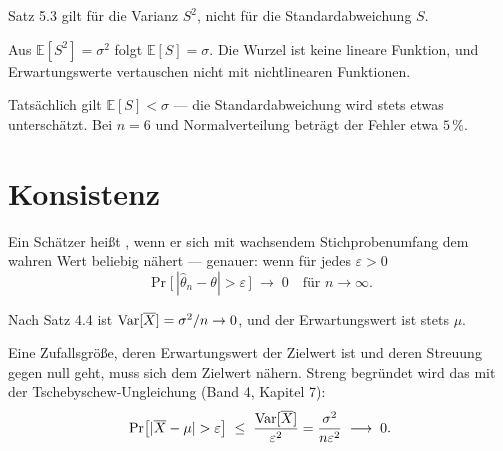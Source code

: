 \begin{warnung}
Satz 5.3 gilt für die Varianz $S^2$, nicht für die Standardabweichung $S$.

Aus $\mathbb{E}[S^2] = \sigma^2$ folgt  $\mathbb{E}[S] = \sigma$. Die Wurzel ist keine lineare Funktion, und Erwartungswerte vertauschen nicht mit nichtlinearen Funktionen.

Tatsächlich gilt $\mathbb{E}[S] < \sigma$ --- die Standardabweichung wird stets etwas unterschätzt. Bei $n=6$ und Normalverteilung beträgt der Fehler etwa $5\,\%$.

\begin{center}
\begin{minipage}{0.88\textwidth}
\end{minipage}
\end{center}
\end{warnung}

\section{Konsistenz}

\begin{definition}
Ein Schätzer heißt , wenn er sich mit wachsendem Stichprobenumfang dem wahren Wert beliebig nähert --- genauer: wenn für jedes $\varepsilon > 0$
\[ \Pr\bigl[\,|\hat\theta_n - \theta| > \varepsilon\,\bigr] \;\longrightarrow\; 0 \quad \text{für } n \to \infty . \]
\end{definition}

\begin{merksatz}
Nach Satz 4.4 ist $\operatorname{Var}[\overline X] = \sigma^2/n \to 0$, und der Erwartungswert ist stets $\mu$.

Eine Zufallsgröße, deren Erwartungswert der Zielwert ist und deren Streuung gegen null geht, muss sich dem Zielwert nähern. Streng begründet wird das mit der Tschebyschew-Ungleichung (Band 4, Kapitel 7):
\[ \Pr\bigl[|\overline X - \mu| > \varepsilon\bigr] \;\le\; \frac{\operatorname{Var}[\overline X]}{\varepsilon^2} = \frac{\sigma^2}{n\varepsilon^2} \;\longrightarrow\; 0 . \]
\end{merksatz}

